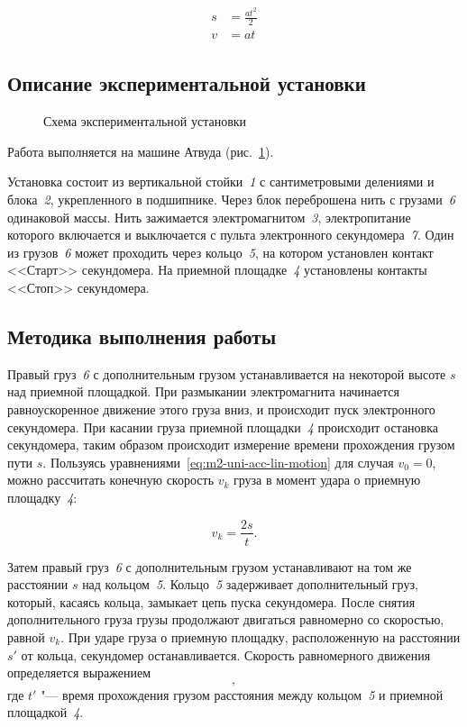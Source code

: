 \documentclass[a4paper, 12pt]{extarticle}
\begin{document}
\begin{align}
\label{eq:m2-uni-acc-lin-motion}
\begin{split}
s &= \frac{at^2}{2} \\
v &= at
\end{split}
\end{align}

\subsection{Описание экспериментальной установки}
\begin{figure}[h] %
\caption{Схема экспериментальной установки \label{fig:m2-atwood-machine}}
\end{figure}
Работа выполняется на машине Атвуда (рис.~\ref{fig:m2-atwood-machine}). 

Установка состоит из вертикальной стойки~\emph{1} с сантиметровыми делениями и блока~\emph{2}, укрепленного в подшипнике. Через блок переброшена нить с грузами~\emph{6} одинаковой массы. Нить зажимается электромагнитом~\emph{3}, электропитание которого включается и выключается с пульта электронного секундомера~\emph{7}. Один из грузов~\emph{6} может проходить через кольцо~\emph{5}, на котором установлен контакт <<Старт>> секундомера. На приемной площадке~\emph{4} установлены контакты <<Стоп>> секундомера. 

\subsection{Методика выполнения работы}
Правый груз~\emph{6} с дополнительным грузом устанавливается на некоторой высоте $s$ над приемной площадкой. При размыкании электромагнита начинается равноускоренное движение этого груза вниз, и происходит пуск электронного секундомера. При касании груза приемной площадки~\emph{4} происходит остановка секундомера, таким образом происходит измерение времени прохождения грузом пути $s$. Пользуясь уравнениями~\eqref{eq:m2-uni-acc-lin-motion} для случая $v_0 = 0$, можно рассчитать конечную скорость $v_k$ груза в момент удара о приемную площадку~\emph{4}:

\begin{equation}
\label{eq:m2-final-speed}
v_k = \frac{2s}{t}.
\end{equation}

Затем правый груз~\emph{6} с дополнительным грузом устанавливают на том же расстоянии $s$ над кольцом~\emph{5}. Кольцо~\emph{5} задерживает дополнительный груз, который, касаясь кольца, замыкает цепь пуска секундомера. После снятия дополнительного груза грузы продолжают двигаться равномерно со скоростью, равной $v_k$. При ударе груза о приемную площадку, расположенную на расстоянии $s'$ от кольца, секундомер останавливается. Скорость равномерного движения определяется выражением 
\begin{equation}
\label{eq:m2-}
,
\end{equation}
где $t'$ "--- время прохождения грузом расстояния между кольцом~\emph{5} и приемной площадкой~\emph{4}. %
\end{document}
